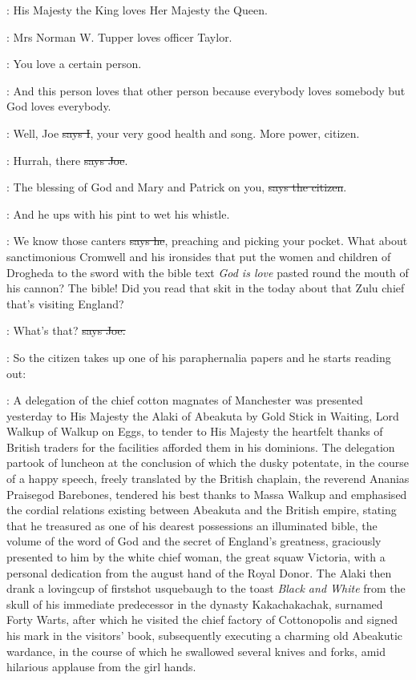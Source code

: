 :
His Majesty the King loves Her Majesty the Queen. 

:
Mrs Norman W. Tupper loves officer Taylor. 

:
You love a certain person. 

:
And this person loves that other person because everybody loves somebody
but God loves everybody.

:
Well, Joe \sout{says I},
your very good health and song. More power, citizen.

\joe:
Hurrah, there \sout{says Joe}.

\citizen:
The blessing of God and Mary and Patrick on you,
\sout{says the citizen}.

\Nq:
And he ups with his pint to wet his whistle.

\citizen:
We know those canters \sout{says he},
preaching and picking your pocket.
What about sanctimonious Cromwell and his ironsides that put the women
and children of Drogheda to the sword with the bible text \emph{God is love}
pasted round the mouth of his cannon? The bible! Did you read that skit in
the  today
about that Zulu chief that's visiting England?

\joe:
What's that? \sout{says Joe.}

\Nq:
So the citizen takes up one of his paraphernalia papers and he starts
reading out:

\citizen:
A delegation of the chief cotton
magnates of Manchester was presented
yesterday to His Majesty the Alaki of Abeakuta by Gold Stick in Waiting,
Lord Walkup of Walkup on Eggs, to tender to His Majesty the heartfelt
thanks of British traders for the facilities afforded them in his
dominions. The delegation partook of luncheon at the conclusion
of which the dusky potentate, in the course of a happy speech,
freely translated by the British chaplain, the reverend Ananias
Praisegod Barebones, tendered his best thanks to Massa Walkup and
emphasised the cordial relations existing between Abeakuta and the
British empire, stating that he treasured as one of his dearest
possessions an illuminated bible, the volume of the word of God
and the secret of England's greatness, graciously presented to him by
the white chief woman, the great squaw Victoria, with a personal
dedication from the august hand of the Royal Donor. The Alaki then drank a
lovingcup of firstshot usquebaugh to the toast \emph{Black and White} from the
skull of his immediate predecessor in the dynasty Kakachakachak,
surnamed Forty Warts, after which he visited the chief factory of
Cottonopolis and signed his mark in the visitors' book, subsequently
executing a charming old Abeakutic wardance, in the course of which he
swallowed several knives and forks, amid hilarious applause from the girl
hands.

